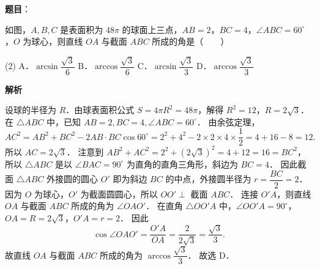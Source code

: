 \begin{answer}

\textbf{题目}：

如图，$A, B, C$ 是表面积为 $48\pi$ 的球面上三点，$AB = 2$，$BC = 4$，$\angle ABC = 60^\circ$，$O$ 为球心，则直线 $OA$ 与截面 $ABC$ 所成的角是\mbox{（　　）}

\begin{gkopts}(2)
\task A．$\arcsin\dfrac{\sqrt{3}}{6}$
\task B．$\arccos\dfrac{\sqrt{3}}{6}$
\task C．$\arcsin\dfrac{\sqrt{3}}{3}$
\task D．$\arccos\dfrac{\sqrt{3}}{3}$
\end{gkopts}
\nopagebreak[4]
\begin{center}\end{center}
\nopagebreak[4]
\textbf{解析}
\nopagebreak[4]
\begin{center}\end{center}
\nopagebreak[4]
设球的半径为 $R$．由球表面积公式 $S = 4\pi R^2 = 48\pi$，解得 $R^2 = 12$，$R = 2\sqrt{3}$．
在 $\triangle ABC$ 中，已知 $AB = 2, BC = 4, \angle ABC = 60^\circ$．
由余弦定理，
\nopagebreak[4]
\[
AC^2 = AB^2 + BC^2 - 2AB \cdot BC \cos 60^\circ = 2^2 + 4^2 - 2 \times 2 \times 4 \times \frac{1}{2} = 4 + 16 - 8 = 12.
\]
所以 $AC = 2\sqrt{3}$．
注意到 $AB^2 + AC^2 = 2^2 + (2\sqrt{3})^2 = 4 + 12 = 16 = BC^2$，
所以 $\triangle ABC$ 是以 $\angle BAC = 90^\circ$ 为直角的直角三角形，斜边为 $BC = 4$．
因此截面 $\triangle ABC$ 外接圆的圆心 $O'$ 即为斜边 $BC$ 的中点，外接圆半径为 $r = \dfrac{BC}{2} = 2$．
因为 $O$ 为球心，$O'$ 为截面圆圆心，所以 $OO' \perp$ 截面 $ABC$．
连接 $O'A$，则直线 $OA$ 与截面 $ABC$ 所成的角为 $\angle OAO'$．
在直角 $\triangle OO'A$ 中，$\angle OO'A = 90^\circ$，$OA = R = 2\sqrt{3}$，$O'A = r = 2$．
因此
\nopagebreak[4]
\[
\cos\angle OAO' = \frac{O'A}{OA} = \frac{2}{2\sqrt{3}} = \frac{\sqrt{3}}{3}.
\]
故直线 $OA$ 与截面 $ABC$ 所成的角为 $\arccos\dfrac{\sqrt{3}}{3}$．
故选 D．


\end{answer}

